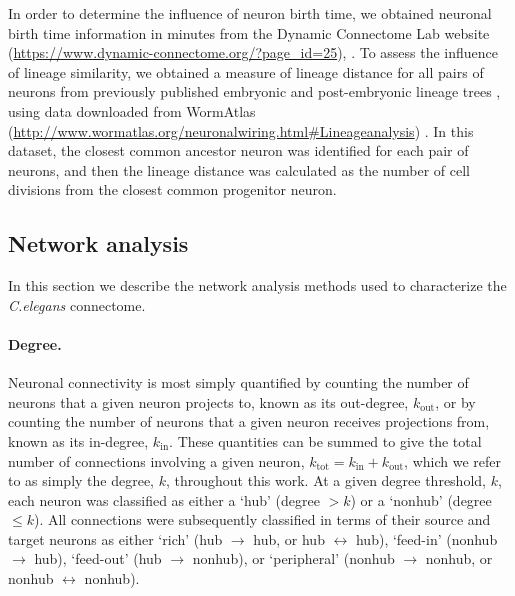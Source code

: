 In order to determine the influence of neuron birth time, we obtained neuronal birth time information in minutes from the Dynamic Connectome Lab website (\url{https://www.dynamic-connectome.org/?page_id=25}), \citep{Varier2011}.
To assess the influence of lineage similarity, we obtained a measure of lineage distance for all pairs of neurons from previously published embryonic and post-embryonic lineage trees \citep{Sulston1977, Sulston1983}, using data downloaded from WormAtlas (\url{http://www.wormatlas.org/neuronalwiring.html#Lineageanalysis}) \citep{WormAtlas}.
In this dataset, the closest common ancestor neuron was identified for each pair of neurons, and then the lineage distance was calculated as the number of cell divisions from the closest common progenitor neuron.

\subsection*{Network analysis}
In this section we describe the network analysis methods used to characterize the \emph{C.elegans} connectome.

\paragraph{Degree.}
Neuronal connectivity is most simply quantified by counting the number of neurons that a given neuron projects to, known as its out-degree, $k_\mathrm{out}$, or by counting the number of neurons that a given neuron receives projections from, known as its in-degree, $k_\mathrm{in}$.
These quantities can be summed to give the total number of connections involving a given neuron, $k_\mathrm{tot} = k_\mathrm{in} + k_\mathrm{out}$, which we refer to as simply the degree, $k$, throughout this work.
At a given degree threshold, $k$, each neuron was classified as either a `hub' (degree $>k$) or a `nonhub' (degree $\leq k$).
All connections were subsequently classified in terms of their source and target neurons as either
`rich' (hub $\rightarrow$ hub, or hub $\leftrightarrow$ hub),
`feed-in' (nonhub $\rightarrow$ hub),
`feed-out' (hub $\rightarrow$ nonhub),
or `peripheral' (nonhub $\rightarrow$ nonhub, or nonhub $\leftrightarrow$ nonhub).


